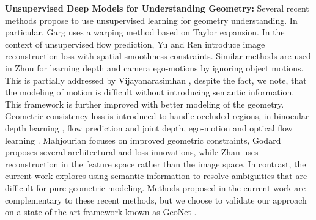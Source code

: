 \documentclass[10pt,twocolumn]{article}
\newcommand{\Noindent}{\vspace{2pt} \noindent}
\newcommand{\partitle}[1]{\Noindent\textbf{#1: }}
\begin{document}
\partitle{Unsupervised Deep Models for Understanding Geometry}Several recent methods propose to use unsupervised learning for geometry understanding. In particular, Garg \etal \cite{Garg2016UnsupervisedCF} uses a warping method based on Taylor expansion. In the context of unsupervised flow prediction, Yu \etal \cite{jason2016back} and Ren \etal \cite{ren2017unsupervised} introduce image reconstruction loss with spatial smoothness constraints. Similar methods are used in Zhou \etal \cite{zhou2017unsupervised} for learning depth and camera ego-motions by ignoring object motions. This is partially addressed by Vijayanarasimhan \etal \cite{vijayanarasimhan2017sfm}, despite the fact, we note, that the modeling of motion is difficult without introducing semantic information. This framework is further improved with better modeling of the geometry. Geometric consistency loss is introduced to handle occluded regions, in binocular depth learning \cite{godard2017unsupervised}, flow prediction \cite{Meister:2018:UUL} and joint depth, ego-motion and optical flow learning \cite{yin2018geonet}. Mahjourian \etal \cite{Mahjourian_2018_CVPR} focuses on improved geometric constraints, Godard \etal \cite{Godard2018DiggingIS} proposes several architectural and loss innovations, while Zhan \etal \cite{Zhan_2018_CVPR} uses reconstruction in the feature space rather than the image space. In contrast, the current work explores using semantic information to resolve ambiguities that are difficult for pure geometric modeling. Methods proposed in the current work are complementary to these recent methods, but we choose to validate our approach on a state-of-the-art framework known as GeoNet \cite{yin2018geonet}.
\end{document}
